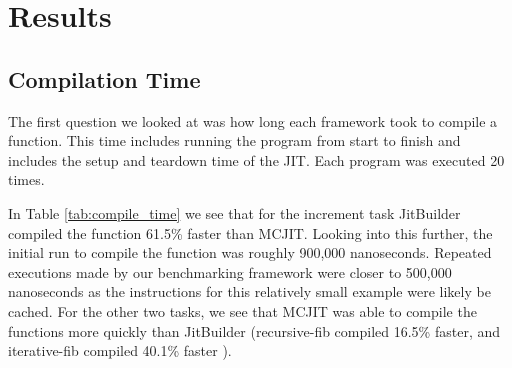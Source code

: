 \section{Results}
\label{sec:results}
\subsection{Compilation Time}
The first question we looked at was how long each framework took to compile a function. 
This time includes running the program from start to finish and includes the setup and teardown time of the JIT.
Each program was executed 20 times.

In Table \ref{tab:compile_time} we see that for the increment task JitBuilder compiled the function 61.5\% faster than MCJIT.
Looking into this further, the initial run to compile the function was roughly 900,000 nanoseconds.
Repeated executions made by our benchmarking framework\cite{googleBench} were closer to 500,000 nanoseconds as the instructions for this relatively small example were likely be cached.
For the other two tasks, we see that MCJIT was able to compile the functions more quickly than JitBuilder (recursive-fib compiled 16.5\% faster, and iterative-fib compiled 40.1\% faster ).


